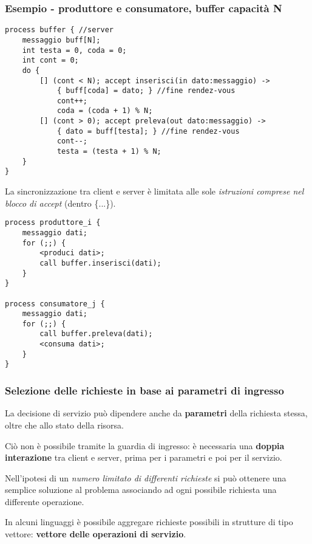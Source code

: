 \subsubsection{Esempio - produttore e consumatore, buffer capacità N}
\begin{verbatim}
process buffer { //server
    messaggio buff[N];
    int testa = 0, coda = 0;
    int cont = 0;
    do {
        [] (cont < N); accept inserisci(in dato:messaggio) ->
            { buff[coda] = dato; } //fine rendez-vous
            cont++;
            coda = (coda + 1) % N;
        [] (cont > 0); accept preleva(out dato:messaggio) ->
            { dato = buff[testa]; } //fine rendez-vous
            cont--;
            testa = (testa + 1) % N;
    }
}
\end{verbatim}
La sincronizzazione tra client e server è limitata alle sole \textit{istruzioni comprese nel blocco di accept} (dentro \{...\}).

\begin{verbatim}
process produttore_i {
    messaggio dati;
    for (;;) {
        <produci dati>;
        call buffer.inserisci(dati);
    }
}

process consumatore_j {
    messaggio dati;
    for (;;) {
        call buffer.preleva(dati);
        <consuma dati>;
    }
}
\end{verbatim}

\subsubsection{Selezione delle richieste in base ai parametri di ingresso}
La decisione di servizio può dipendere anche da \textbf{parametri} della richiesta stessa, oltre che allo stato della risorsa. 

Ciò non è possibile tramite la guardia di ingresso: è necessaria una \textbf{doppia interazione} tra client e server, prima per i parametri e poi per il servizio.

Nell'ipotesi di un \textit{numero limitato di differenti richieste} si può ottenere una semplice soluzione al problema associando ad ogni possibile richiesta una differente operazione.

In alcuni linguaggi è possibile aggregare richieste possibili in strutture di tipo vettore: \textbf{vettore delle operazioni di servizio}.

